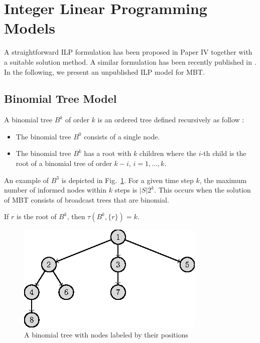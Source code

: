 \section{Integer Linear Programming Models}

A straightforward ILP formulation has been proposed in Paper IV together with a suitable solution method.
A similar formulation has been recently published in \cite{desousa18}.
In the following, we present an unpublished ILP model for MBT.

\subsection{Binomial Tree Model}

A binomial tree $B^k$ of order $k$ is an ordered tree defined recursively as follow \cite{cormen01}:
\begin{itemize}
\item The binomial tree $B^0$ consists of a single node.
\item The binomial tree $B^k$ has a root with $k$ children where the $i$-th child is the root of a binomial tree of order $k-i$, $i=1,\dots,k$.
\end{itemize}
An example of $B^3$ is depicted in Fig.~\ref{fig:beta}.
For a given time step $k$, the maximum number of informed nodes within $k$ steps is $|S|2^k$.
This occurs when the solution of MBT consists of broadcast trees that are binomial.
\begin{observation}
\label{obs:btspread}
If $r$ is the root of $B^k$, then $\tau(B^k,\{r\})=k$.
\end{observation}
\begin{figure}
\centering
	\includegraphics{figurer/btindex.eps}
\caption{A binomial tree with nodes labeled by their positions}
\label{fig:beta}
\end{figure}

